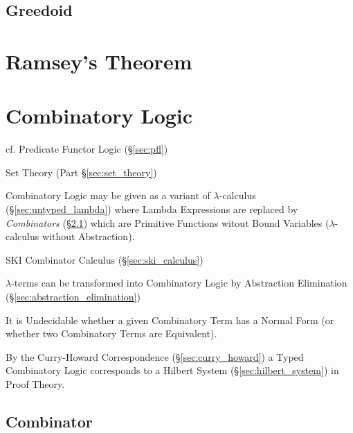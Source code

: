 \subsection{Greedoid}\label{sec:greedoid}



\section{Ramsey's Theorem}\label{sec:ramseys_theorem}

\section{Combinatory Logic}\label{sec:combinatory_logic}

cf. Predicate Functor Logic (\S\ref{sec:pfl})

Set Theory (Part \S\ref{sec:set_theory})

Combinatory Logic may be given as a variant of $\lambda$-calculus
(\S\ref{sec:untyped_lambda}) where Lambda Expressions are replaced by
\emph{Combinators} (\S\ref{sec:combinator}) which are Primitive
Functions witout Bound Variables ($\lambda$-calculus without
Abstraction).

SKI Combinator Calculus (\S\ref{sec:ski_calculus})

$\lambda$-terms can be transformed into Combinatory Logic by
Abstraction Elimination (\S\ref{sec:abstraction_elimination})

It is Undecidable whether a given Combinatory Term has a Normal Form
(or whether two Combinatory Terms are Equivalent).

By the Curry-Howard Correspondence (\S\ref{sec:curry_howard}) a Typed
Combinatory Logic corresponds to a Hilbert System
(\S\ref{sec:hilbert_system}) in Proof Theory.



\subsection{Combinator}\label{sec:combinator}

